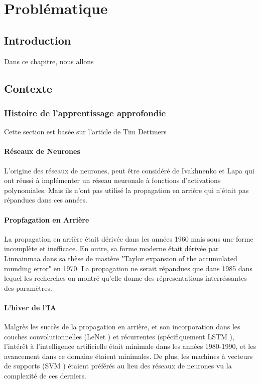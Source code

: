 \chapter{Problématique}
\section{Introduction}

Dans ce chapitre, nous allons 
\newpage 
\section{Contexte}
\subsection{Histoire de l'apprentissage approfondie}
Cette section est basée sur l'article de Tim Dettmers \cite{DeepLearningHistory}
\subsubsection{Réseaux de Neurones}
L'origine des réseaux de neurones, peut être considéré de Ivakhnenko et Lapa \cite{FirstDeepNN} qui ont réussi à implémenter un réseau neuronale à fonctions d'activations polynomiales. Mais ils n'ont pas utilisé la propagation en arrière qui n'était pas répandues dans ces années.
\subsubsection{Propfagation en Arrière} 
La propagation en arrière était dérivée dans les années 1960 mais sous une forme incomplète et inefficace. En outre, sa forme moderne était dérivée par Linnainmaa dans sa thèse de mastère \cite{OriginalBackPropagation} "Taylor expansion of the accumulated rounding error" en 1970. La propagation ne serait répandues que dans 1985 dans lequel les recherches on montré qu'elle donne des répresentations interréssantes des paramètres.
\subsubsection{L'hiver de l'IA}
Malgrès les succès de la propagation en arrière, et son incorporation dans les couches convolutionnelles (LeNet \cite{LeNet}) et récurrentes (spécifiquement LSTM \cite{LSTMPaper}), l'intérêt à l'intelligence artificielle était minimale dans les années 1980-1990, et les avancement dans ce domaine étaient minimales.
\newline De plus, les machines à vecteurs de supports (SVM \cite{OriginalSVM}) étaient préférés au lieu des réseaux de neurones vu la complexité de ces derniers.
